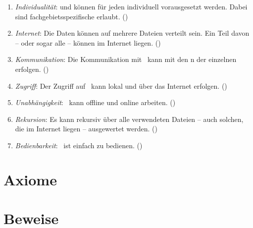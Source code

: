 \begin{enumerate}
	\item \label{Anforderung:Individualität} \emph{Individualität}:
	 und  können für jeden  individuell vorausgesetzt werden.
	Dabei sind fachgebietsspezifische  erlaubt.
	()

	\item \label{Anforderung:Internet} \emph{Internet}:
	Die Daten können auf mehrere Dateien verteilt sein.
	Ein Teil davon -- oder sogar alle -- können im Internet liegen.
	()

	\item \label{Anforderung:Kommunikation} \emph{Kommunikation}:
	Die Kommunikation mit \ASBA\ kann mit den n der einzelnen  erfolgen.
	()

	\item \label{Anforderung:Zugriff} \emph{Zugriff}:
	Der Zugriff auf \ASBA\ kann lokal und über das Internet erfolgen.
	()

	\item \label{Anforderung:Unabhängigkeit} \emph{Unabhängigkeit}:
	\ASBA\ kann offline und online arbeiten.
	()

	\item \label{Anforderung:Rekursion} \emph{Rekursion}:
	Es kann rekursiv über alle verwendeten Dateien -- auch solchen, die im Internet liegen -- ausgewertet werden.
	()

	\item \label{Anforderung:Bedienbarkeit} \emph{Bedienbarkeit}:
	\ASBA\ ist einfach zu bedienen.
	()

\end{enumerate}

\section{Axiome}%
\label{sec:Axiome}

\section{Beweise}%
\label{sec:Beweise}


